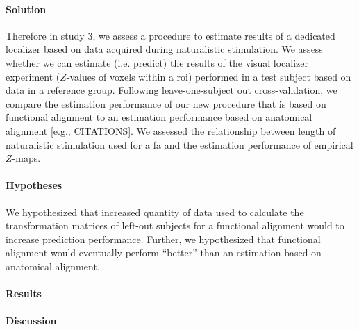 \paragraph{Solution}
%
Therefore in study 3, we assess a procedure to estimate results of a dedicated
localizer \citep{sengupta2016extension} based on data acquired during
naturalistic stimulation.
%
We assess whether we can estimate (i.e. predict) the results of the visual
localizer experiment ($Z$-values of voxels within a \ac{roi}) performed in a
test subject based on data in a reference group.
%
Following leave-one-subject out cross-validation, we compare the estimation
performance of our new procedure that is based on functional alignment to an
estimation performance based on anatomical alignment [e.g., CITATIONS].
We assessed the relationship between length of naturalistic stimulation used
for a \ac{fa} and the estimation performance of empirical $Z$-maps.


\paragraph{Hypotheses}
%
We hypothesized that increased quantity of data used to calculate the
transformation matrices of left-out subjects for a functional alignment would to
increase prediction performance.
%
Further, we hypothesized that functional alignment would eventually perform
``better'' than an estimation based on anatomical alignment.


\paragraph{Results}


\paragraph{Discussion}
